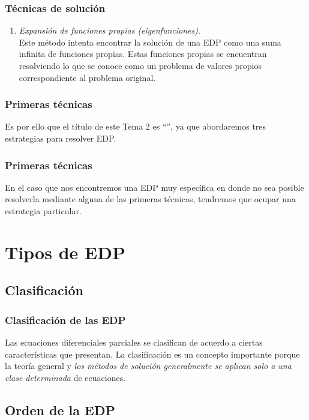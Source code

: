 \documentclass[12pt]{beamer}
\begin{document}
\begin{frame}
\frametitle{Técnicas de solución}
\begin{enumerate}
\conti
\item \emph{Expansión de funciones propias (eigenfunciones)}.
\\
\bigskip
Este método intenta encontrar la solución de una EDP como una suma infinita de funciones propias. Estas funciones propias se encuentran resolviendo lo que se conoce como un problema de valores propios correspondiente al problema original.
\end{enumerate}
\end{frame}
\begin{frame}
\frametitle{Primeras técnicas}
Es por ello que el título de este Tema 2 es \enquote{}, ya que abordaremos tres estrategias para resolver EDP.
\end{frame}
\begin{frame}
\frametitle{Primeras técnicas}
En el caso que nos encontremos una EDP muy específica en donde no sea posible resolverla mediante alguna de las primeras técnicas, tendremos que ocupar una estrategia particular.
\end{frame}

\section{Tipos de EDP}
\subsection{Clasificación}

\begin{frame}
\frametitle{Clasificación de las EDP}
Las ecuaciones diferenciales parciales se clasifican de acuerdo a ciertas características que presentan. La clasificación es un concepto importante porque la teoría general y \emph{los métodos de solución generalmente se aplican solo a una clase determinada} de ecuaciones.
\end{frame}

\subsection*{Orden de la EDP}
\end{document}
